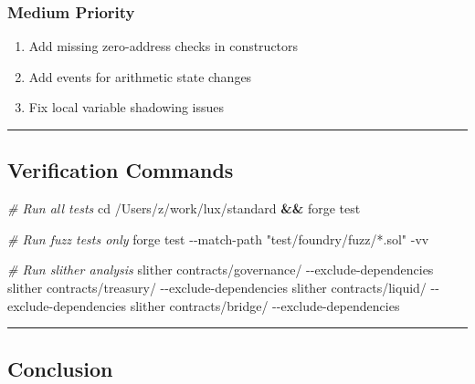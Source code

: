 \documentclass[
]{article}
\newenvironment{Shaded}{}{}
\newcommand{\AttributeTok}[1]{\textcolor[rgb]{0.49,0.56,0.16}{#1}}
\newcommand{\BuiltInTok}[1]{\textcolor[rgb]{0.00,0.50,0.00}{#1}}
\newcommand{\CommentTok}[1]{\textcolor[rgb]{0.38,0.63,0.69}{\textit{#1}}}
\newcommand{\ExtensionTok}[1]{#1}
\newcommand{\KeywordTok}[1]{\textcolor[rgb]{0.00,0.44,0.13}{\textbf{#1}}}
\newcommand{\NormalTok}[1]{#1}
\newcommand{\StringTok}[1]{\textcolor[rgb]{0.25,0.44,0.63}{#1}}
\providecommand{\tightlist}{%
  \setlength{\itemsep}{0pt}\setlength{\parskip}{0pt}}
\begin{document}
\subsubsection{Medium Priority}\label{medium-priority}

\begin{enumerate}
\def\labelenumi{\arabic{enumi}.}
\setcounter{enumi}{6}
\tightlist
\item
  Add missing zero-address checks in constructors
\item
  Add events for arithmetic state changes
\item
  Fix local variable shadowing issues
\end{enumerate}

\begin{center}\rule{0.5\linewidth}{0.5pt}\end{center}

\subsection{Verification Commands}\label{verification-commands}

\begin{Shaded}
\begin{Highlighting}[]
\CommentTok{\# Run all tests}
\BuiltInTok{cd}\NormalTok{ /Users/z/work/lux/standard }\KeywordTok{\&\&} \ExtensionTok{forge}\NormalTok{ test}

\CommentTok{\# Run fuzz tests only}
\ExtensionTok{forge}\NormalTok{ test }\AttributeTok{{-}{-}match{-}path} \StringTok{"test/foundry/fuzz/*.sol"} \AttributeTok{{-}vv}

\CommentTok{\# Run slither analysis}
\ExtensionTok{slither}\NormalTok{ contracts/governance/ }\AttributeTok{{-}{-}exclude{-}dependencies}
\ExtensionTok{slither}\NormalTok{ contracts/treasury/ }\AttributeTok{{-}{-}exclude{-}dependencies}
\ExtensionTok{slither}\NormalTok{ contracts/liquid/ }\AttributeTok{{-}{-}exclude{-}dependencies}
\ExtensionTok{slither}\NormalTok{ contracts/bridge/ }\AttributeTok{{-}{-}exclude{-}dependencies}
\end{Highlighting}
\end{Shaded}

\begin{center}\rule{0.5\linewidth}{0.5pt}\end{center}

\subsection{Conclusion}\label{conclusion}
\end{document}
